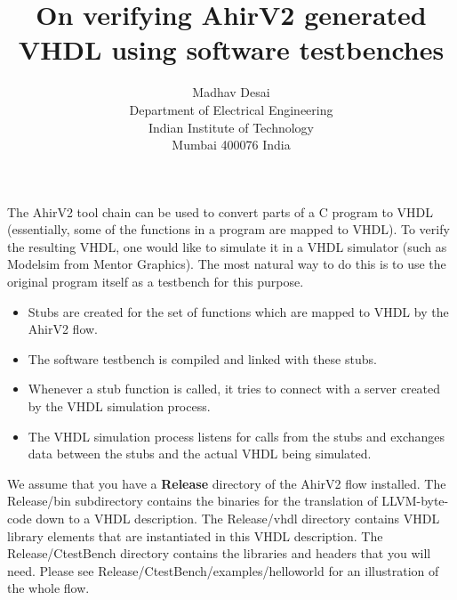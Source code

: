 \documentclass{article}
\title{On verifying AhirV2 generated VHDL using software testbenches}
\author{Madhav Desai \\ Department of Electrical Engineering \\ Indian Institute of Technology \\
	Mumbai 400076 India}
\begin{document}
\maketitle


The AhirV2 tool chain can be used to convert parts of a C program to VHDL
(essentially, some of the functions in a program are mapped to VHDL).
To verify the resulting VHDL, one would like to simulate it in a
VHDL simulator (such as Modelsim from Mentor Graphics).  The most
natural way to do this is to use the original program itself
as a testbench for this purpose.

\begin{itemize}
\item Stubs are created for the set of functions which are mapped to  
VHDL by the AhirV2 flow.
\item The software testbench is compiled and linked with these stubs.
\item Whenever a stub function is called, it tries to connect with
a server created by the VHDL simulation process.
\item The VHDL simulation process listens for calls from the stubs
and exchanges data between the stubs and the actual VHDL being simulated.
\end{itemize}


We assume that you have a {\bf Release} directory of the AhirV2 flow
installed.   The Release/bin subdirectory contains the binaries for
the translation of LLVM-byte-code down to a VHDL description. 
The Release/vhdl directory contains VHDL library elements that 
are instantiated in this VHDL description.  The Release/CtestBench 
directory contains the libraries and headers that you will need.  
Please see Release/CtestBench/examples/helloworld for an 
illustration of the whole flow.
\end{document}
